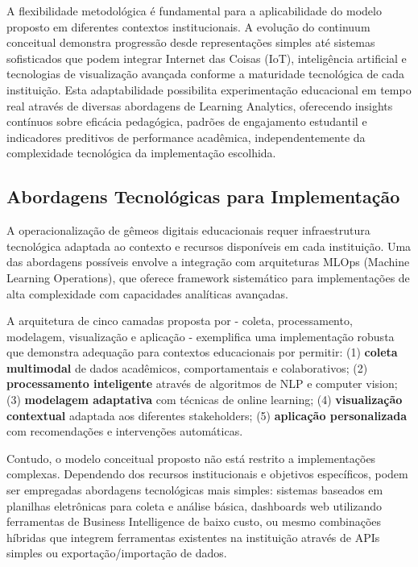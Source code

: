 \documentclass[english, spanish, brazilian]{RBIEarticle} %
\begin{document}
A flexibilidade metodológica é fundamental para a aplicabilidade do modelo
proposto em diferentes contextos institucionais. A evolução do continuum
conceitual demonstra progressão desde representações simples até sistemas
sofisticados que podem integrar Internet das Coisas (IoT), inteligência
artificial e tecnologias de visualização avançada conforme a maturidade
tecnológica de cada instituição. Esta adaptabilidade possibilita experimentação
educacional em tempo real através de diversas abordagens de Learning Analytics,
oferecendo insights contínuos sobre eficácia pedagógica, padrões de engajamento
estudantil e indicadores preditivos de performance acadêmica, independentemente
da complexidade tecnológica da implementação escolhida.

\subsection{Abordagens Tecnológicas para Implementação}

\indent

A operacionalização de gêmeos digitais educacionais requer infraestrutura
tecnológica adaptada ao contexto e recursos disponíveis em cada instituição.
Uma das abordagens possíveis envolve a integração com arquiteturas MLOps
(Machine Learning Operations), que oferece framework sistemático para
implementações de alta complexidade com capacidades analíticas avançadas.

A arquitetura de cinco camadas proposta por \cite{Fujii2022} - coleta,
processamento, modelagem, visualização e aplicação - exemplifica uma
implementação robusta que demonstra adequação para contextos educacionais por
permitir: (1) \textbf{coleta multimodal} de dados acadêmicos, comportamentais e
colaborativos; (2) \textbf{processamento inteligente} através de algoritmos de
NLP e computer vision; (3) \textbf{modelagem adaptativa} com técnicas de online
learning; (4) \textbf{visualização contextual} adaptada aos diferentes
stakeholders; (5) \textbf{aplicação personalizada} com recomendações e
intervenções automáticas.

Contudo, o modelo conceitual proposto não está restrito a implementações
complexas. Dependendo dos recursos institucionais e objetivos específicos,
podem ser empregadas abordagens tecnológicas mais simples: sistemas baseados em
planilhas eletrônicas para coleta e análise básica, dashboards web utilizando
ferramentas de Business Intelligence de baixo custo, ou mesmo combinações
híbridas que integrem ferramentas existentes na instituição através de APIs
simples ou exportação/importação de dados.
\end{document}
